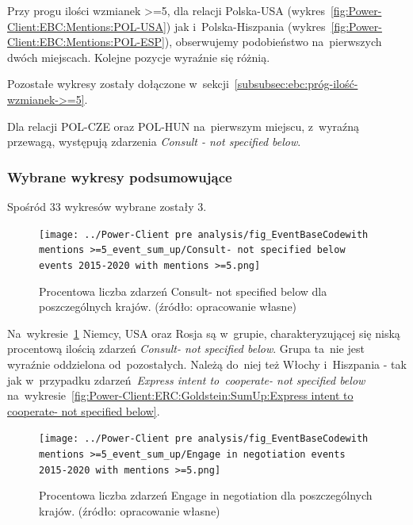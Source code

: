 \documentclass[11pt]{report}
\begin{document}
    Przy progu ilości wzmianek >=5, dla relacji Polska-USA (wykres~\ref{fig:Power-Client:EBC:Mentions:POL-USA}) jak i~Polska-Hiszpania (wykres~\ref{fig:Power-Client:EBC:Mentions:POL-ESP}),
    obserwujemy podobieństwo na~pierwszych dwóch miejscach.
    Kolejne pozycje wyraźnie się różnią.

    Pozostałe wykresy zostały dołączone w~sekcji~\ref{subsubsec:ebc:próg-ilość-wzmianek->=5}.

    Dla relacji POL-CZE oraz POL-HUN na~pierwszym miejscu, z~wyraźną przewagą, występują zdarzenia \textit{Consult - not specified below}.

    \subsubsection{Wybrane wykresy podsumowujące}

    Spośród 33 wykresów wybrane zostały 3.

    \begin{figure}[tp]
        \centering
        \texttt{[image: ../Power-Client pre analysis/fig\_EventBaseCodewith mentions >=5\_event\_sum\_up/Consult- not specified below events 2015-2020 with mentions >=5.png]}
        \caption{Procentowa liczba zdarzeń Consult- not specified below dla poszczególnych krajów. (źródło: opracowanie własne)}
        \label{fig:Power-Client:ERC:Mentions:SumUp:Consult- not specified below}
    \end{figure}

    Na~wykresie~\ref{fig:Power-Client:ERC:Mentions:SumUp:Consult- not specified below} Niemcy, USA oraz Rosja są w~grupie,
    charakteryzującej się niską procentową ilością zdarzeń \textit{Consult- not specified below}.
    Grupa ta~nie jest wyraźnie oddzielona od~pozostałych.
    Należą do~niej też Włochy i~Hiszpania - tak jak w~przypadku zdarzeń~\textit{Express intent to~cooperate- not specified below}
    na~wykresie~\ref{fig:Power-Client:ERC:Goldstein:SumUp:Express intent to cooperate- not specified below}.

    \begin{figure}[tp]
        \centering
        \texttt{[image: ../Power-Client pre analysis/fig\_EventBaseCodewith mentions >=5\_event\_sum\_up/Engage in negotiation events 2015-2020 with mentions >=5.png]}
        \caption{Procentowa liczba zdarzeń Engage in negotiation dla poszczególnych krajów. (źródło: opracowanie własne)}
        \label{fig:Power-Client:ERC:Mentions:SumUp:Engage in negotiation}
    \end{figure}
\end{document}
